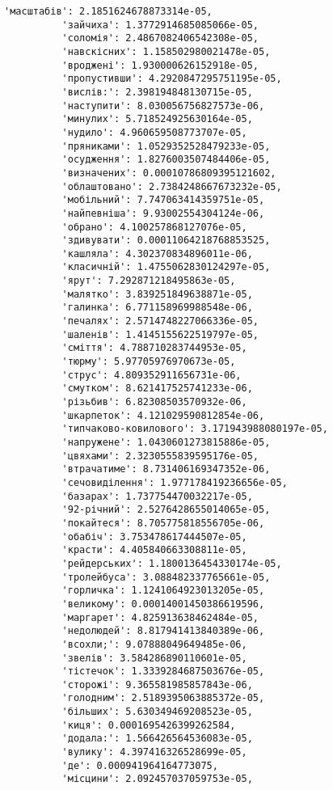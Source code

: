 \documentclass[11pt]{article}
\begin{document}
\begin{Verbatim}[commandchars=\\\{\}]
          'масштабів': 2.1851624678873314e-05,
          'зайчиха': 1.3772914685085066e-05,
          'соломія': 2.4867082406542308e-05,
          'навскісних': 1.158502980021478e-05,
          'вроджені': 1.930000626152918e-05,
          'пропустивши': 4.2920847295751195e-05,
          'вислів:': 2.398194848130715e-05,
          'наступити': 8.030056756827573e-06,
          'минулих': 5.718524925630164e-05,
          'нудило': 4.960659508773707e-05,
          'пряниками': 1.0529352528479233e-05,
          'осудження': 1.8276003507484406e-05,
          'визначених': 0.00010786809395121602,
          'облаштовано': 2.7384248667673232e-05,
          'мобільний': 7.747063414359751e-05,
          'найпевніша': 9.93002554304124e-06,
          'обрано': 4.100257868127076e-05,
          'здивувати': 0.00011064218768853525,
          'кашляла': 4.302370834896011e-06,
          'класичній': 1.4755062830124297e-05,
          'ярут': 7.292871218495863e-05,
          'малятко': 3.839251849638871e-05,
          'галинка': 6.771158969988548e-06,
          'печалях': 2.5714748227066336e-05,
          'шаленів': 1.4145155622519797e-05,
          'сміття': 4.788710283744953e-05,
          'тюрму': 5.97705976970673e-05,
          'струс': 4.809352911656731e-06,
          'смутком': 8.621417525741233e-06,
          'різьбив': 6.82308503570932e-06,
          'шкарпеток': 4.121029590812854e-06,
          'типчаково-ковилового': 3.171943988080197e-05,
          'напружене': 1.0430601273815886e-05,
          'цвяхами': 2.3230555839595176e-05,
          'втрачатиме': 8.731406169347352e-06,
          'сечовиділення': 1.977178419236656e-05,
          'базарах': 1.737754470032217e-05,
          '92-річний': 2.5276428655014065e-05,
          'покайтеся': 8.705775818556705e-06,
          'обабіч': 3.753478617444507e-05,
          'красти': 4.405840663308811e-05,
          'рейдерських': 1.1800136454330174e-05,
          'тролейбуса': 3.088482337765661e-05,
          'горличка': 1.1241064923013205e-05,
          'великому': 0.00014001450386619596,
          'маргарет': 4.825913638462484e-05,
          'недолюдей': 8.817941413840389e-06,
          'всохли;': 9.07888049649485e-06,
          'звелів': 3.584286890110601e-05,
          'тістечок': 1.3339284687503676e-05,
          'сторожі': 9.365581985857843e-06,
          'голодним': 2.5189395063885372e-05,
          'більших': 5.630349469208523e-05,
          'киця': 0.0001695426399262584,
          'додала:': 1.566426564536083e-05,
          'вулику': 4.397416326528699e-05,
          'де': 0.000941964164773075,
          'місцини': 2.092457037059753e-05,

\end{Verbatim}
\end{document}
